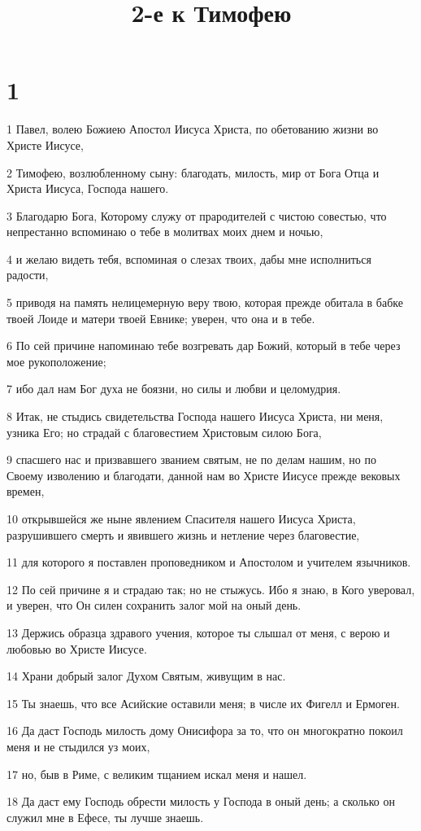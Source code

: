 

\title{2-е к Тимофею}


\chapter{1}

\par 1 Павел, волею Божиею Апостол Иисуса Христа, по обетованию жизни во Христе Иисусе,
\par 2 Тимофею, возлюбленному сыну: благодать, милость, мир от Бога Отца и Христа Иисуса, Господа нашего.
\par 3 Благодарю Бога, Которому служу от прародителей с чистою совестью, что непрестанно вспоминаю о тебе в молитвах моих днем и ночью,
\par 4 и желаю видеть тебя, вспоминая о слезах твоих, дабы мне исполниться радости,
\par 5 приводя на память нелицемерную веру твою, которая прежде обитала в бабке твоей Лоиде и матери твоей Евнике; уверен, что она и в тебе.
\par 6 По сей причине напоминаю тебе возгревать дар Божий, который в тебе через мое рукоположение;
\par 7 ибо дал нам Бог духа не боязни, но силы и любви и целомудрия.
\par 8 Итак, не стыдись свидетельства Господа нашего Иисуса Христа, ни меня, узника Его; но страдай с благовестием Христовым силою Бога,
\par 9 спасшего нас и призвавшего званием святым, не по делам нашим, но по Своему изволению и благодати, данной нам во Христе Иисусе прежде вековых времен,
\par 10 открывшейся же ныне явлением Спасителя нашего Иисуса Христа, разрушившего смерть и явившего жизнь и нетление через благовестие,
\par 11 для которого я поставлен проповедником и Апостолом и учителем язычников.
\par 12 По сей причине я и страдаю так; но не стыжусь. Ибо я знаю, в Кого уверовал, и уверен, что Он силен сохранить залог мой на оный день.
\par 13 Держись образца здравого учения, которое ты слышал от меня, с верою и любовью во Христе Иисусе.
\par 14 Храни добрый залог Духом Святым, живущим в нас.
\par 15 Ты знаешь, что все Асийские оставили меня; в числе их Фигелл и Ермоген.
\par 16 Да даст Господь милость дому Онисифора за то, что он многократно покоил меня и не стыдился уз моих,
\par 17 но, быв в Риме, с великим тщанием искал меня и нашел.
\par 18 Да даст ему Господь обрести милость у Господа в оный день; а сколько он служил мне в Ефесе, ты лучше знаешь.

